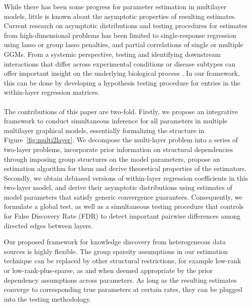 While there has been some progress for parameter estimation in multilayer models, little is known about the asymptotic properties of resulting estimates. Current research on asymptotic distributions and testing procedures for estimates from high-dimensional problems has been limited to single-response regression using lasso \citep{ZhangZhang14,JavanmardMontanari14,JavanmardMontanari18,vanDeGeerEtal14} or group lasso \citep{MitraZhang16} penalties, and partial correlations of single \citep{CaiLiu16} or multiple \citep{BelilovskyEtal16,Liu17} GGMs. From a systemic perspective, testing and identifying downstream interactions that differ across experimental conditions or disease subtypes can offer important insight on the underlying biological process \citep{MaoEtal17,LiEtal15}. In our framework, this can be done by developing a hypothesis testing procedure for entries in the within-layer regression matrices.

\paragraph{}
The contributions of this paper are two-fold. Firstly, we propose an integrative framework to conduct simultaneous inference for all parameters in multiple multilayer graphical models, essentially formalizing the structure in Figure~\ref{fig:multi2layer}. We decompose the multi-layer problem into a series of two-layer problems, incorporate prior information on structural dependencies through imposing group structures on the model parameters, propose an estimation algorithm for them and derive theoretical properties of the estimators. Secondly, we obtain debiased versions of within-layer regression coefficients in this two-layer model, and derive their asymptotic distributions using estimates of model parameters that satisfy generic convergence guarantees. Consequently, we formulate a global test, as well as a simultaneous testing procedure that controls for False Discovery Rate (FDR) to detect important pairwise differences among directed edges between layers.

Our proposed framework for knowledge discovery from heterogeneous data sources is highly flexible. The group sparsity assumptions in our estimation technique can be replaced by other structural restrictions, for example low-rank or low-rank-plus-sparse, as and when deemed appropriate by the prior dependency assumptions across parameters. As long as the resulting estimates converge to corresponding true parameters at certain rates, they can be plugged into the testing methodology.

